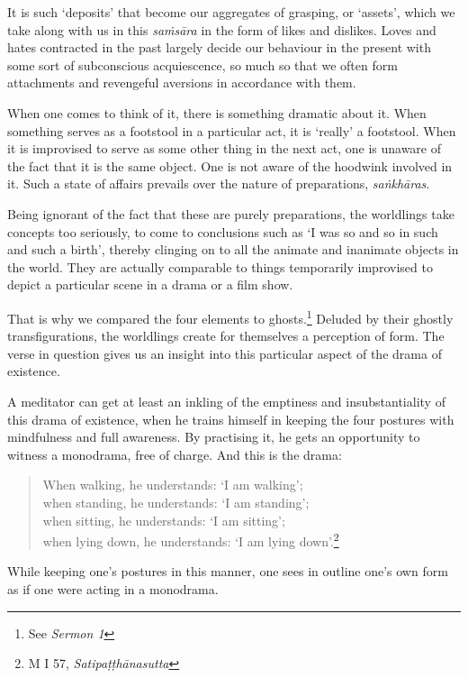 It is such `deposits' that become our aggregates of grasping, or `assets', which we take along with us in this \emph{saṁsāra} in the form of likes and dislikes. Loves and hates contracted in the past largely decide our behaviour in the present with some sort of subconscious acquiescence, so much so that we often form attachments and revengeful aversions in accordance with them.

When one comes to think of it, there is something dramatic about it. When something serves as a footstool in a particular act, it is `really' a footstool. When it is improvised to serve as some other thing in the next act, one is unaware of the fact that it is the same object. One is not aware of the hoodwink involved in it. Such a state of affairs prevails over the nature of preparations, \emph{saṅkhāras}.

Being ignorant of the fact that these are purely preparations, the worldlings take concepts too seriously, to come to conclusions such as `I was so and so in such and such a birth', thereby clinging on to all the animate and inanimate objects in the world. They are actually comparable to things temporarily improvised to depict a particular scene in a drama or a film show.

That is why we compared the four elements to ghosts.\footnote{See \emph{Sermon 1}} Deluded by their ghostly transfigurations, the worldlings create for themselves a perception of form. The verse in question gives us an insight into this particular aspect of the drama of existence.

A meditator can get at least an inkling of the emptiness and insubstantiality of this drama of existence, when he trains himself in keeping the four postures with mindfulness and full awareness. By practising it, he gets an opportunity to witness a monodrama, free of charge. And this is the drama:

\begin{quote}
When walking, he understands: `I am walking';\\
when standing, he understands: `I am standing';\\
when sitting, he understands: `I am sitting';\\
when lying down, he understands: `I am lying down'.\footnote{M I 57, \emph{Satipaṭṭhānasutta}}
\end{quote}

While keeping one's postures in this manner, one sees in outline one's own form as if one were acting in a monodrama.

